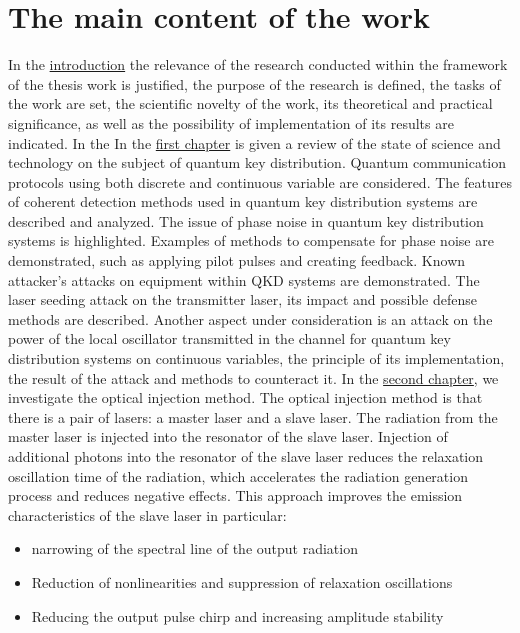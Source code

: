 \section*{The main content of the work}
In the \underline{introduction} the relevance of the research conducted within the framework of the thesis work is justified, the purpose of the research is defined, the tasks of the work are set, the scientific novelty of the work, its theoretical and practical significance, as well as the possibility of implementation of its results are indicated. 
In the \newline In the \underline{first chapter} is given a review of the state of science and technology on the subject of quantum key distribution. Quantum communication protocols using both discrete and continuous variable are considered. The features of coherent detection methods used in quantum key distribution systems are described and analyzed. The issue of phase noise in quantum key distribution systems is highlighted. Examples of methods to compensate for phase noise are demonstrated, such as applying pilot pulses and creating feedback.  Known attacker's attacks on equipment within QKD systems are demonstrated. The laser seeding attack on the transmitter laser, its impact and possible defense methods are described. Another aspect under consideration is an attack on the power of the local oscillator transmitted in the channel for quantum key distribution systems on continuous variables, the principle of its implementation, the result of the attack and methods to counteract it.
\newline In the \underline{second chapter}, we investigate the optical injection method. The optical injection method is that there is a pair of lasers: a master laser and a slave laser. The radiation from the master laser is injected into the resonator of the slave laser. Injection of additional photons into the resonator of the slave laser reduces the relaxation oscillation time of the radiation, which accelerates the radiation generation process and reduces negative effects. This approach improves the emission characteristics of the slave laser in particular:
\begin{itemize}
    \item narrowing of the spectral line of the output radiation
    \item Reduction of nonlinearities and suppression of relaxation oscillations
    \item Reducing the output pulse chirp and increasing amplitude stability
\end{itemize}
